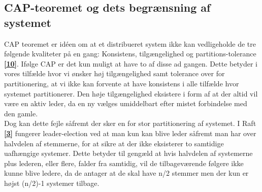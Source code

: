 \documentclass[a4paper,12pt]{article}
\begin{document}
\subsection{CAP-teoremet og dets begrænsning af systemet}
CAP teoremet er idéen om at et distribueret system ikke kan vedligeholde de tre følgende kvaliteter på en gang: Konsistens, tilgængelighed og partitions-tolerance \hyperref[ti]{\textbf{[10]}}. Ifølge CAP er det kun muligt at have to af disse ad gangen. Dette betyder i vores tilfælde hvor vi ønsker høj tilgængelighed samt tolerance over for partitionering, at vi ikke kan forvente at have konsistens i alle tilfælde hvor systemet partitionerer.
Den høje tilgængelighed eksistere i form af at der altid vil være en aktiv leder, da en ny vælges umiddelbart efter mistet forbindelse med den gamle.
\\
Dog kan dette fejle såfremt der sker en for stor partitionering af systemet. 
I Raft \hyperref[tre]{\textbf{[3]}} fungerer leader-election ved at man kun kan blive leder såfremt man har over halvdelen af stemmerne, for at sikre at der ikke eksisterer to samtidige uafhængige systemer. Dette betyder til gengæld at hvis halvdelen af systemerne plus lederen, eller flere, falder fra samtidig, vil de tilbageværende følgere ikke kunne blive ledere, da de antager at de skal have n/2 stemmer men der kun er højst (n/2)-1 systemer tilbage. 
\end{document}
